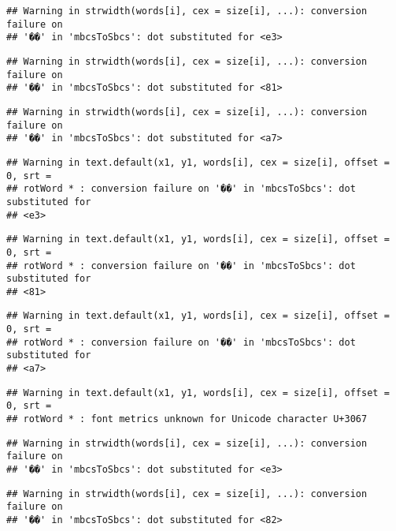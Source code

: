 \documentclass[]{article}
\begin{document}
\begin{verbatim}
## Warning in strwidth(words[i], cex = size[i], ...): conversion failure on
## '��' in 'mbcsToSbcs': dot substituted for <e3>
\end{verbatim}

\begin{verbatim}
## Warning in strwidth(words[i], cex = size[i], ...): conversion failure on
## '��' in 'mbcsToSbcs': dot substituted for <81>
\end{verbatim}

\begin{verbatim}
## Warning in strwidth(words[i], cex = size[i], ...): conversion failure on
## '��' in 'mbcsToSbcs': dot substituted for <a7>
\end{verbatim}

\begin{verbatim}
## Warning in text.default(x1, y1, words[i], cex = size[i], offset = 0, srt =
## rotWord * : conversion failure on '��' in 'mbcsToSbcs': dot substituted for
## <e3>
\end{verbatim}

\begin{verbatim}
## Warning in text.default(x1, y1, words[i], cex = size[i], offset = 0, srt =
## rotWord * : conversion failure on '��' in 'mbcsToSbcs': dot substituted for
## <81>
\end{verbatim}

\begin{verbatim}
## Warning in text.default(x1, y1, words[i], cex = size[i], offset = 0, srt =
## rotWord * : conversion failure on '��' in 'mbcsToSbcs': dot substituted for
## <a7>
\end{verbatim}

\begin{verbatim}
## Warning in text.default(x1, y1, words[i], cex = size[i], offset = 0, srt =
## rotWord * : font metrics unknown for Unicode character U+3067
\end{verbatim}

\begin{verbatim}
## Warning in strwidth(words[i], cex = size[i], ...): conversion failure on
## '��' in 'mbcsToSbcs': dot substituted for <e3>
\end{verbatim}

\begin{verbatim}
## Warning in strwidth(words[i], cex = size[i], ...): conversion failure on
## '��' in 'mbcsToSbcs': dot substituted for <82>
\end{verbatim}
\end{document}
